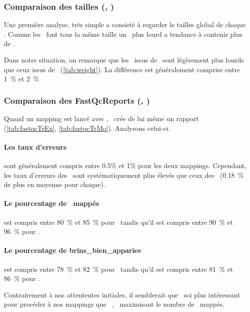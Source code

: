 \documentclass[../main]{subfiles} %
\begin{document}
\subsubsection{Comparaison des tailles (\BamTrEx, \BamTrMo)}
Une première analyse, très simple a consisté à regarder le tailles global de chaque \bam. Comme les \reads font tous la même taille un \bam plus lourd a tendance à contenir plus de \reads.






Dans notre situation, on remarque que les \bam issus de \TrMo sont légèrement plus lourds que ceux issus de \TrEx (\cref{tab:weight}). La différence est généralement comprise entre 1 \% et 2 \%


\subsubsection{Comparaison des FastQcReports (\BamTrEx, \BamTrMo)}
\label{sec:fastqc}
Quand un \gls{mapping} est lancé avec \GeCKO, \GeCKO crée de lui même un rapport \fastqc (\cref{tab:fastqcTrEx}, \cref{tab:fastqcTrMo}). Analysons celui-ci.







\paragraph{Les taux d'erreurs} sont généralement compris entre 0.5\% et 1\% pour les deux \glspl{mapping}. Cependant, les taux d'erreurs des \BamTrMo sont systématiquement plus élevés que ceux des \BamTrEx (0.18 \% de plus en moyenne pour chaque). 

\paragraph{Le pourcentage de \reads mappés} est compris entre 80 \% et 85 \% pour \TrMo tandis qu'il est compris entre 90 \% et 96 \% pour \TrEx.

\paragraph{Le pourcentage de \gls{brins_bien_apparies}} est compris entre 78 \% et 82 \% pour \TrMo tandis qu'il est compris entre 81 \% et 86 \% pour \TrEx.

Contrairement à nos attententes initiales, il semblerait que \TrEx soi plus intéressant pour procéder à nos \glspl{mapping} que \TrMo , \TrEx maximisant le nombre de \reads mappés.
\end{document}
